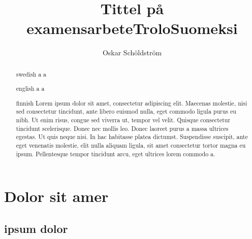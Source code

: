 \documentclass[twoside,emptyfirstpagenumber,swedish]{../thesis}
\begin{document}

\title{Tittel på examensarbete}
\author{Oskar Schöldström}
\date{\the\year}


\maketitle


\begin{abstract}{swedish}
a  a \\
\end{abstract}

\title{Trolo}
\begin{abstract}{english}
a  a \\
\end{abstract}

\title{Suomeksi}
\begin{abstract}{finnish}
Lorem ipsum dolor sit amet, consectetur adipiscing elit. Maecenas molestie, nisi sed consectetur tincidunt, ante libero euismod nulla, eget commodo ligula purus eu nibh. Ut enim risus, congue sed viverra ut, tempor vel velit. Quisque consectetur tincidunt scelerisque. Donec nec mollis leo. Donec laoreet purus a massa ultrices egestas. Ut quis neque nisi. In hac habitasse platea dictumst. Suspendisse suscipit, ante eget venenatis molestie, elit nulla aliquam ligula, sit amet consectetur tortor magna eu ipsum. Pellentesque tempor tincidunt arcu, eget ultrices lorem commodo a.
\end{abstract}


\tableofcontents

\thispagestyle{empty}
\listoftables
\listoffigures
\clearpage


\section{Dolor sit amer}

\subsection{ipsum dolor}
\end{document}

